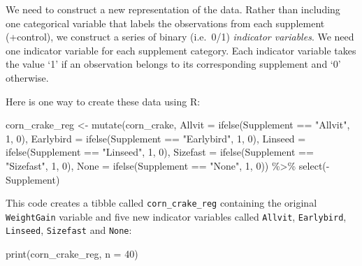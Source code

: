 \documentclass[
]{book}
\newenvironment{Shaded}{\begin{snugshade}}{\end{snugshade}}
\newcommand{\AttributeTok}[1]{\textcolor[rgb]{0.77,0.63,0.00}{#1}}
\newcommand{\DecValTok}[1]{\textcolor[rgb]{0.00,0.00,0.81}{#1}}
\newcommand{\FunctionTok}[1]{\textcolor[rgb]{0.00,0.00,0.00}{#1}}
\newcommand{\NormalTok}[1]{#1}
\newcommand{\OtherTok}[1]{\textcolor[rgb]{0.56,0.35,0.01}{#1}}
\newcommand{\SpecialCharTok}[1]{\textcolor[rgb]{0.00,0.00,0.00}{#1}}
\newcommand{\StringTok}[1]{\textcolor[rgb]{0.31,0.60,0.02}{#1}}
\begin{document}
We need to construct a new representation of the data. Rather than including one categorical variable that labels the observations from each supplement (+control), we construct a series of binary (i.e.~0/1) \emph{indicator variables}. We need one indicator variable for each supplement category. Each indicator variable takes the value `1' if an observation belongs to its corresponding supplement and `0' otherwise.

Here is one way to create these data using R:

\begin{Shaded}
\begin{Highlighting}[]
\NormalTok{corn\_crake\_reg }\OtherTok{\textless{}{-}} 
  \FunctionTok{mutate}\NormalTok{(corn\_crake,}
         \AttributeTok{Allvit    =} \FunctionTok{ifelse}\NormalTok{(Supplement }\SpecialCharTok{==} \StringTok{"Allvit"}\NormalTok{,    }\DecValTok{1}\NormalTok{, }\DecValTok{0}\NormalTok{),}
         \AttributeTok{Earlybird =} \FunctionTok{ifelse}\NormalTok{(Supplement }\SpecialCharTok{==} \StringTok{"Earlybird"}\NormalTok{, }\DecValTok{1}\NormalTok{, }\DecValTok{0}\NormalTok{),}
         \AttributeTok{Linseed   =} \FunctionTok{ifelse}\NormalTok{(Supplement }\SpecialCharTok{==} \StringTok{"Linseed"}\NormalTok{,   }\DecValTok{1}\NormalTok{, }\DecValTok{0}\NormalTok{),}
         \AttributeTok{Sizefast  =} \FunctionTok{ifelse}\NormalTok{(Supplement }\SpecialCharTok{==} \StringTok{"Sizefast"}\NormalTok{,  }\DecValTok{1}\NormalTok{, }\DecValTok{0}\NormalTok{),}
         \AttributeTok{None      =} \FunctionTok{ifelse}\NormalTok{(Supplement }\SpecialCharTok{==} \StringTok{"None"}\NormalTok{,      }\DecValTok{1}\NormalTok{, }\DecValTok{0}\NormalTok{)) }\SpecialCharTok{\%\textgreater{}\%} 
  \FunctionTok{select}\NormalTok{(}\SpecialCharTok{{-}}\NormalTok{Supplement)}
\end{Highlighting}
\end{Shaded}

This code creates a tibble called \texttt{corn\_crake\_reg} containing the original \texttt{WeightGain} variable and five new indicator variables called \texttt{Allvit}, \texttt{Earlybird}, \texttt{Linseed}, \texttt{Sizefast} and \texttt{None}:

\begin{Shaded}
\begin{Highlighting}[]
\FunctionTok{print}\NormalTok{(corn\_crake\_reg, }\AttributeTok{n =} \DecValTok{40}\NormalTok{)}
\end{Highlighting}
\end{Shaded}
\end{document}

